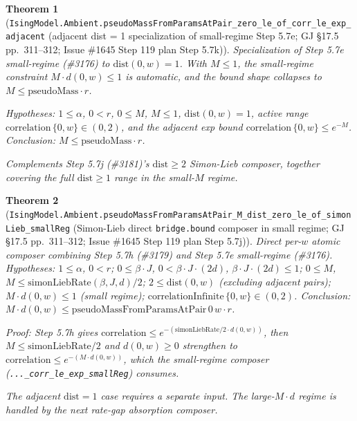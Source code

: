 \documentclass[a4paper,11pt]{article}
\newtheorem{theorem}{Theorem}
\begin{document}
\begin{theorem}[\texttt{IsingModel.Ambient.pseudoMassFromParamsAtPair\_zero\_le\_of\_corr\_le\_exp\_adjacent}
(adjacent dist = 1 specialization of small-regime Step 5.7e;
GJ \S17.5 pp.~311--312; Issue \#1645 Step 119 plan Step 5.7k)]
Specialization of Step 5.7e small-regime (\#3176) to $\mathrm{dist}(0, w) = 1$.
With $M \le 1$, the small-regime constraint $M \cdot d(0, w) \le 1$ is
automatic, and the bound shape collapses to $M \le \mathrm{pseudoMass} \cdot r$.

Hypotheses: $1 \le \alpha$, $0 < r$, $0 \le M$, $M \le 1$,
$\mathrm{dist}(0, w) = 1$, active range
$\mathrm{correlation}\,\{0, w\} \in (0, 2)$, and the adjacent exp bound
$\mathrm{correlation}\,\{0, w\} \le e^{-M}$. Conclusion:
$M \le \mathrm{pseudoMass} \cdot r$.

Complements Step 5.7j (\#3181)'s $\mathrm{dist} \ge 2$ Simon-Lieb composer,
together covering the full $\mathrm{dist} \ge 1$ range in the small-$M$
regime.
\end{theorem}

\begin{theorem}[\texttt{IsingModel.Ambient.pseudoMassFromParamsAtPair\_M\_dist\_zero\_le\_of\_simonLieb\_smallReg}
(Simon-Lieb direct \texttt{bridge.bound} composer in small regime;
GJ \S17.5 pp.~311--312; Issue \#1645 Step 119 plan Step 5.7j)]
Direct per-$w$ atomic composer combining Step 5.7h (\#3179) and Step 5.7e
small-regime (\#3176). Hypotheses:
$1 \le \alpha$, $0 < r$;
$0 \le \beta\cdot J$, $0 < \beta\cdot J\cdot(2d)$, $\beta\cdot J\cdot(2d) \le 1$;
$0 \le M$, $M \le \mathrm{simonLiebRate}(\beta, J, d)/2$;
$2 \le \mathrm{dist}(0, w)$ (excluding adjacent pairs);
$M \cdot d(0, w) \le 1$ (small regime);
$\mathrm{correlationInfinite}\,\{0, w\} \in (0, 2)$. Conclusion:
$M \cdot d(0, w) \le \mathrm{pseudoMassFromParamsAtPair}\,0\,w \cdot r$.

Proof: Step 5.7h gives $\mathrm{correlation} \le
e^{-(\mathrm{simonLiebRate}/2 \cdot d(0,w))}$, then $M \le \mathrm{simonLiebRate}/2$
and $d(0,w) \ge 0$ strengthen to $\mathrm{correlation} \le e^{-(M\cdot d(0,w))}$,
which the small-regime composer
(\texttt{...\_corr\_le\_exp\_smallReg}) consumes.

The adjacent $\mathrm{dist} = 1$ case requires a separate input.  The
large-$M\cdot d$ regime is handled by the next rate-gap absorption composer.
\end{theorem}
\end{document}

